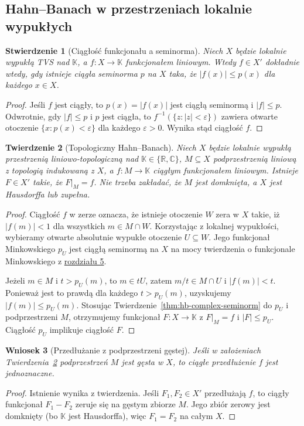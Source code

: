 \documentclass[11pt,a4paper]{article}
\numberwithin{equation}{section}
\theoremstyle{plain}
\newtheorem{twierdzenie}{Twierdzenie}[section]
\newtheorem{stwierdzenie}[twierdzenie]{Stwierdzenie}
\newtheorem{wniosek}[twierdzenie]{Wniosek}
\theoremstyle{definition}
\theoremstyle{remark}
\newcommand{\R}{\mathbb R}
\newcommand{\C}{\mathbb C}
\newcommand{\K}{\mathbb K}
\begin{document}
\subsection{Hahn--Banach w przestrzeniach lokalnie wypukłych}

\begin{stwierdzenie}[Ciągłość funkcjonału a seminorma]
\label{prop:dual-seminorm-criterion}
Niech $X$ będzie lokalnie wypukłą TVS nad $\K$,
a $f:X\to\K$ funkcjonałem liniowym. Wtedy
$f\in X'$ dokładnie wtedy, gdy istnieje ciągła
seminorma $p$ na $X$ taka, że
$|f(x)|\le p(x)$ dla każdego $x\in X$.
\end{stwierdzenie}
\begin{proof}
Jeśli $f$ jest ciągły, to $p(x)=|f(x)|$ jest
ciągłą seminormą i $|f|\le p$. Odwrotnie, gdy
$|f|\le p$ i $p$ jest ciągła, to
$f^{-1}(\{z:|z|<\varepsilon\})$ zawiera otwarte
otoczenie $\{x:p(x)<\varepsilon\}$ dla każdego
$\varepsilon>0$. Wynika stąd ciągłość $f$.
\end{proof}

\begin{twierdzenie}[Topologiczny Hahn--Banach]\label{thm:hb-topological}
Niech $X$ będzie lokalnie wypukłą przestrzenią
liniowo-topologiczną nad $\K\in\{\R,\C\}$,
$M\subseteq X$ podprzestrzenią liniową z topologią
indukowaną z $X$, a $f:M\to\K$ ciągłym funkcjonałem
liniowym. Istnieje $F\in X'$ takie, że $F|_M=f$.
Nie trzeba zakładać, że $M$ jest domknięta, a $X$
jest Hausdorffa lub zupełna.
\end{twierdzenie}
\begin{proof}
Ciągłość $f$ w zerze oznacza, że istnieje otoczenie
$W$ zera w $X$ takie, iż $|f(m)|<1$ dla wszystkich
$m\in M\cap W$. Korzystając z lokalnej wypukłości,
wybieramy otwarte absolutnie wypukłe otoczenie
$U\subseteq W$. Jego funkcjonał Minkowskiego $p_U$
jest ciągłą seminormą na $X$ na mocy
twierdzenia o funkcjonale Minkowskiego z \hyperref[sec:lokalnie-wypukle]{rozdziału 5}.

Jeżeli $m\in M$ i $t>p_U(m)$, to $m\in tU$,
zatem $m/t\in M\cap U$ i $|f(m)|<t$.
Ponieważ jest to prawdą dla każdego $t>p_U(m)$,
uzyskujemy $|f(m)|\le p_U(m)$.
Stosując Twierdzenie~\ref{thm:hb-complex-seminorm}
do $p_U$ i podprzestrzeni $M$, otrzymujemy funkcjonał
$F:X\to\K$ z $F|_M=f$ i $|F|\le p_U$.
Ciągłość $p_U$ implikuje ciągłość $F$.
\end{proof}

\begin{wniosek}[Przedłużanie z podprzestrzeni gęstej]
\label{cor:dense-extension}
Jeśli w założeniach Twierdzenia~\ref{thm:hb-topological}
podprzestrzeń $M$ jest gęsta w $X$, to ciągłe
przedłużenie $f$ jest jednoznaczne.
\end{wniosek}
\begin{proof}
Istnienie wynika z twierdzenia. Jeśli $F_1,F_2\in X'$
przedłużają $f$, to ciągły funkcjonał $F_1-F_2$
zeruje się na gęstym zbiorze $M$. Jego zbiór zerowy
jest domknięty (bo $\K$ jest Hausdorffa), więc
$F_1=F_2$ na całym $X$.
\end{proof}
\end{document}
